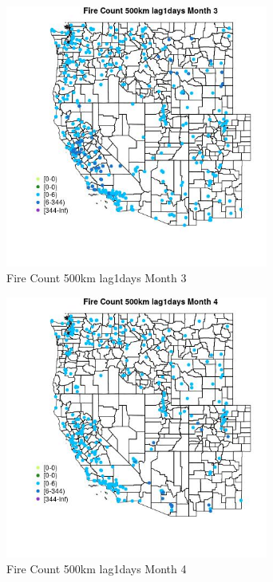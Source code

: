 \begin{figure} 
\centering  
\includegraphics[width=0.77\textwidth]{Code_Outputs/Report_ML_input_PM25_Step4_part_e_de_duplicated_aves_compiled_2019-05-18wNAs_MapObsMo3Fire_Count_500km_lag1days.jpg} 
\caption{\label{fig:Report_ML_input_PM25_Step4_part_e_de_duplicated_aves_compiled_2019-05-18wNAsMapObsMo3Fire_Count_500km_lag1days}Fire Count 500km lag1days Month 3} 
\end{figure} 
 

\begin{figure} 
\centering  
\includegraphics[width=0.77\textwidth]{Code_Outputs/Report_ML_input_PM25_Step4_part_e_de_duplicated_aves_compiled_2019-05-18wNAs_MapObsMo4Fire_Count_500km_lag1days.jpg} 
\caption{\label{fig:Report_ML_input_PM25_Step4_part_e_de_duplicated_aves_compiled_2019-05-18wNAsMapObsMo4Fire_Count_500km_lag1days}Fire Count 500km lag1days Month 4} 
\end{figure} 
 

